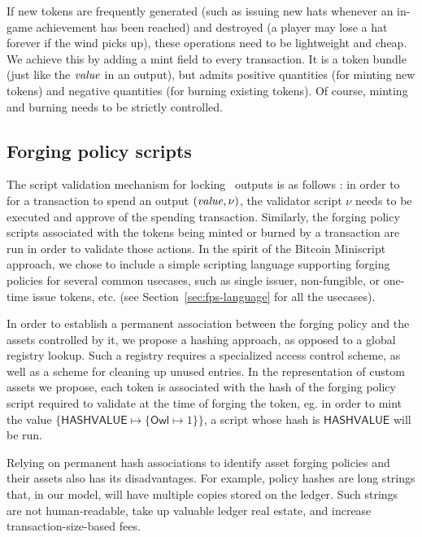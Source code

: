 If new tokens are frequently generated (such as issuing new hats whenever an in-game achievement has been reached) and destroyed (a player may lose a hat forever if the wind picks up), these operations need to be lightweight and cheap. We achieve this by adding a mint field to every transaction. It is a token bundle (just like the $\mathit{value}$ in an output), but admits positive quantities (for minting new tokens) and negative quantities (for burning existing tokens). Of course, minting and burning needs to be strictly controlled.

\subsection{Forging policy scripts}

The script validation mechanism for locking \UTXO\ outputs is as follows :
in order to for a transaction to spend an output \((\mathit{value}, \nu)\), the validator
script $\nu$ needs to be executed and approve of the spending transaction.
Similarly, the forging
policy scripts associated with the tokens being minted or burned by a transaction
are run in order to validate those actions.
In the spirit of the Bitcoin Miniscript approach, we chose to include a simple
scripting language supporting forging policies for several common usecases, such as
single issuer, non-fungible, or one-time issue tokens, etc.
(see Section~\ref{sec:fps-language} for all the usecases).

In order to establish a permanent association between the forging policy and the
assets controlled by it, we propose a hashing approach, as opposed to a global registry
lookup. Such a registry requires a specialized access control scheme, as well
as a scheme for cleaning up unused entries.
In the representation of custom assets we propose, each token is associated with the
hash of the forging policy script required to validate at the time of forging
the token, eg.
in order to mint the value
\(\{\mathsf{HASHVALUE} \mapsto \{\mathsf{Owl} \mapsto 1\}\}\), a script whose
hash is $\mathsf{HASHVALUE}$ will be run.

Relying on permanent hash associations to identify asset forging policies and their assets also has its disadvantages.
For example, policy hashes are long strings that, in our model, will have multiple copies stored on the ledger.
Such strings are not human-readable, take up valuable ledger real estate, and increase transaction-size-based fees.

